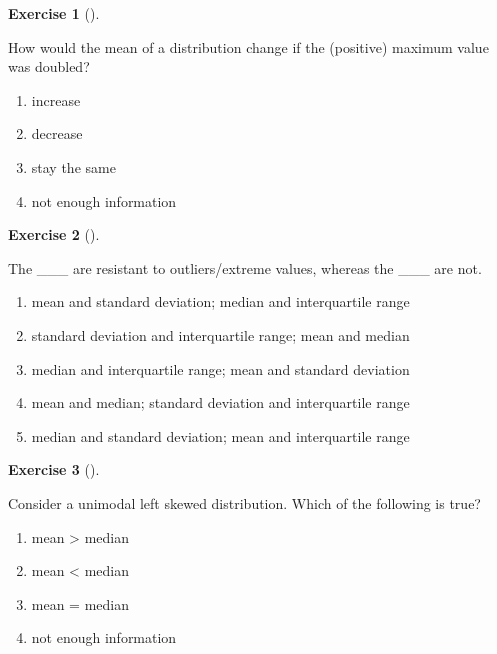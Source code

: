 \documentclass[
  letterpaper,
  DIV=11,
  numbers=noendperiod]{scrreprt}
\providecommand{\tightlist}{%
  \setlength{\itemsep}{0pt}\setlength{\parskip}{0pt}}\usepackage{longtable,booktabs,array}
\theoremstyle{definition}
\newtheorem{exercise}{Exercise}[chapter]
\theoremstyle{remark}
\begin{document}
\begin{exercise}[]\protect\hypertarget{exr-ch03-c05}{}\label{exr-ch03-c05}

How would the mean of a distribution change if the (positive) maximum
value was doubled?

\begin{enumerate}
\def\labelenumi{\alph{enumi})}
\tightlist
\item
  increase
\item
  decrease
\item
  stay the same
\item
  not enough information
\end{enumerate}

\end{exercise}

\begin{exercise}[]\protect\hypertarget{exr-ch03-c06}{}\label{exr-ch03-c06}

The \_\_\_ are resistant to outliers/extreme values, whereas the \_\_\_
are not.

\begin{enumerate}
\def\labelenumi{\alph{enumi})}
\tightlist
\item
  mean and standard deviation; median and interquartile range
\item
  standard deviation and interquartile range; mean and median
\item
  median and interquartile range; mean and standard deviation
\item
  mean and median; standard deviation and interquartile range
\item
  median and standard deviation; mean and interquartile range
\end{enumerate}

\end{exercise}

\begin{exercise}[]\protect\hypertarget{exr-ch03-c07}{}\label{exr-ch03-c07}

Consider a unimodal left skewed distribution. Which of the following is
true?

\begin{enumerate}
\def\labelenumi{\alph{enumi})}
\tightlist
\item
  mean \textgreater{} median
\item
  mean \textless{} median
\item
  mean = median
\item
  not enough information
\end{enumerate}

\end{exercise}
\end{document}
